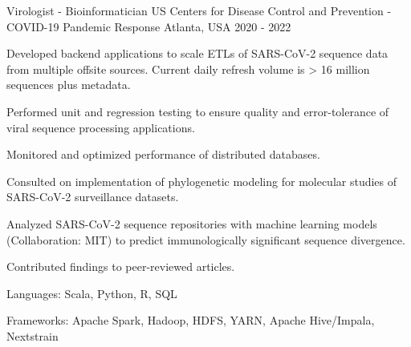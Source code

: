 \begin{cventries}
  \cventry
    {Virologist - Bioinformatician} %
    {US Centers for Disease Control and Prevention - COVID-19 Pandemic Response} %
    {Atlanta, USA} %
    {2020 - 2022} %
    {
      \begin{cvitems} %
	\item {Developed backend applications to scale ETLs of SARS-CoV-2 sequence data from multiple offsite sources. Current daily refresh volume is > 16 million sequences plus metadata.}
        \item {Performed unit and regression testing to ensure quality and error-tolerance of viral sequence processing applications.}
	 \item {Monitored and optimized performance of distributed databases.}
        \item {Consulted on implementation of phylogenetic modeling for molecular studies of SARS-CoV-2 surveillance datasets.}
	\item {Analyzed SARS-CoV-2 sequence repositories with machine learning models (Collaboration: MIT) to predict immunologically significant sequence divergence.}
        \item {Contributed findings to peer-reviewed articles.}
        \item {Languages: Scala, Python, R, SQL}
	\item {Frameworks: Apache Spark, Hadoop, HDFS, YARN, Apache Hive/Impala, Nextstrain}
      \end{cvitems}
    }
  \vspace{2.0mm}
  
  
  
  \end{cventries}
